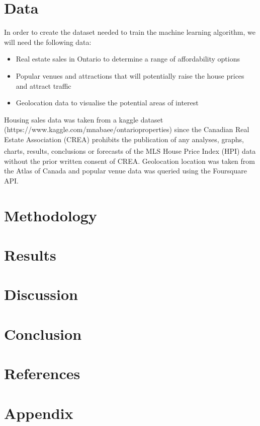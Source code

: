 \documentclass{article}
\begin{document}
\section{Data}

In order to create the dataset needed to train the machine learning algorithm, we will need the following data:

\begin{itemize}
	\item Real estate sales in Ontario to determine a range of affordability options
	\item Popular venues and attractions that will potentially raise the house prices and attract traffic
	\item Geolocation data to visualise the potential areas of interest  
\end{itemize}

Housing sales data was taken from a kaggle dataset (https://www.kaggle.com/mnabaee/ontarioproperties) since the Canadian Real Estate Association (CREA) prohibits the publication of any analyses, graphs, charts, results, conclusions or forecasts of the MLS\textsuperscript{\textregistered} House Price Index (HPI) data without the prior written consent of CREA. Geolocation location was taken from the Atlas of Canada and popular venue data was queried using the Foursquare API. 

\section{Methodology}

\section{Results}

\section{Discussion}

\section{Conclusion}

\section{References}

\section{Appendix}
\end{document}
